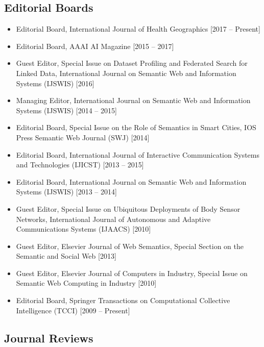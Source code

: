 \documentclass[10pt,a4paper]{res} %
\begin{document}
\begin{resume}
\subsection*{Editorial Boards}
\begin{itemize} \itemsep -2pt
\item Editorial Board, International Journal of Health Geographics [2017 -- Present]
\item Editorial Board, AAAI AI Magazine [2015 -- 2017]
\item Guest Editor, Special Issue on Dataset Profiling and Federated Search for Linked Data, International Journal on Semantic Web and Information Systems (IJSWIS) [2016]
\item Managing Editor, International Journal on Semantic Web and Information Systems (IJSWIS) [2014 -- 2015]
\item Editorial Board, Special Issue on the Role of Semantics in Smart Cities, IOS Press Semantic Web Journal (SWJ) [2014]
\item Editorial Board, International Journal of Interactive Communication Systems and Technologies (IJICST) [2013 -- 2015]
\item Editorial Board, International Journal on Semantic Web and Information Systems (IJSWIS) [2013 -- 2014]
\item Guest Editor, Special Issue on Ubiquitous Deployments of Body Sensor Networks, International Journal of Autonomous and Adaptive Communications Systems (IJAACS) [2010]
\item Guest Editor, Elsevier Journal of Web Semantics, Special Section on the Semantic and Social Web [2013]
\item Guest Editor, Elsevier Journal of Computers in Industry, Special Issue on Semantic Web Computing in Industry [2010]
\item Editorial Board, Springer Transactions on Computational Collective Intelligence (TCCI) [2009 -- Present]
\end{itemize}

\subsection*{Journal Reviews}


\end{resume}
\end{document}
